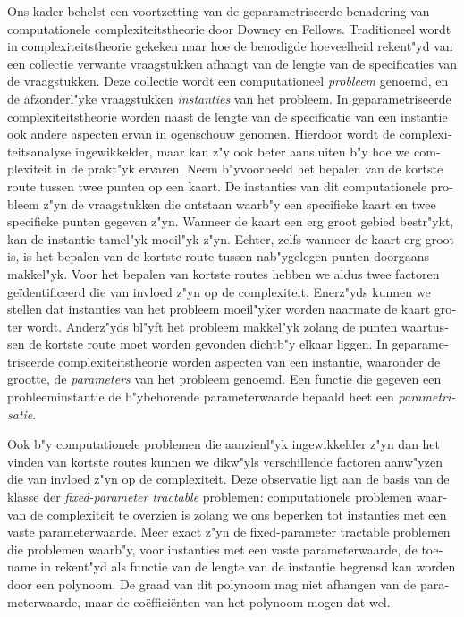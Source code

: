 {\begin{otherlanguage}{dutch}
Ons kader behelst een voortzetting van de geparametriseerde benadering van computationele complexiteitstheorie door Downey en Fellows.
Traditioneel wordt in complexiteitstheorie gekeken naar hoe de benodigde hoeveelheid rekent"yd van een collectie verwante vraagstukken afhangt van de lengte van de specificaties van de vraagstukken.
Deze collectie wordt een computationeel \emph{probleem} genoemd, en de afzonderl"yke vraagstukken \emph{instanties} van het probleem.
In geparametriseerde complexiteitstheorie worden naast de lengte van de specificatie van een instantie ook andere aspecten ervan in ogenschouw genomen.
Hierdoor wordt de complexiteitsanalyse ingewikkelder, maar kan z"y ook beter aansluiten b"y hoe we complexiteit in de prakt"yk ervaren.
Neem b"yvoorbeeld het bepalen van de kortste route tussen twee punten op een kaart.
De instanties van dit computationele probleem z"yn de vraagstukken die ontstaan waarb"y een specifieke kaart en twee specifieke punten gegeven z"yn.
Wanneer de kaart een erg groot gebied bestr"ykt, kan de instantie tamel"yk moeil"yk z"yn.
Echter, zelfs wanneer de kaart erg groot is, is het bepalen van de kortste route tussen nab"ygelegen punten doorgaans makkel"yk.
Voor het bepalen van kortste routes hebben we aldus twee factoren ge{\"i}dentificeerd die van invloed z"yn op de complexiteit.
Enerz"yds kunnen we stellen dat instanties van het probleem moeil"yker worden naarmate de kaart groter wordt.
Anderz"yds bl"yft het probleem makkel"yk zolang de punten waartussen de kortste route moet worden gevonden dichtb"y elkaar liggen.
In geparametriseerde complexiteitstheorie worden aspecten van een instantie, waaronder de grootte, de \emph{parameters} van het probleem genoemd.
Een functie die gegeven een probleeminstantie de b"ybehorende parameterwaarde bepaald heet een \emph{parametrisatie}.

Ook b"y computationele problemen die aanzienl"yk ingewikkelder z"yn dan het vinden van kortste routes kunnen we dikw"yls verschillende factoren aanw"yzen die van invloed z"yn op de complexiteit.
Deze observatie ligt aan de basis van de klasse der \emph{fixed-parameter tractable} problemen: computationele problemen waarvan de complexiteit te overzien is zolang we ons beperken tot instanties met een vaste parameterwaarde.
Meer exact z"yn de fixed-parameter tractable problemen die problemen waarb"y, voor instanties met een vaste parameterwaarde, de toename in rekent"yd als functie van de lengte van de instantie begrensd kan worden door een polynoom.
De graad van dit polynoom mag niet afhangen van de parameterwaarde, maar de co{\"e}ffici{\"e}nten van het polynoom mogen dat wel.


\end{otherlanguage}}

